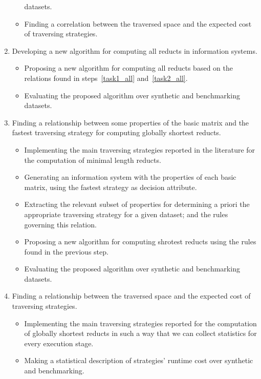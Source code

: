 \documentclass[authoryear,11pt]{elsarticle}
\begin{document}
\begin{enumerate}
\begin{itemize}
  			  datasets.
  		\item Finding a correlation between the traversed space and the expected cost of traversing strategies.
  	\end{itemize}
  	\item Developing a new algorithm for computing all reducts in information systems.
  	\begin{itemize}
  		\item Proposing a new algorithm for computing all reducts based on the relations found in 
  			  steps~\ref{task1_all} and~\ref{task2_all}.
  		\item Evaluating the proposed algorithm over synthetic and benchmarking datasets.
  	\end{itemize}
  	
  	\item Finding a relationship between some properties of the basic matrix and the fastest 
  		  traversing strategy for computing globally shortest reducts.\label{task1_short}
	\begin{itemize}
  		\item Implementing the main traversing strategies reported in the literature for the computation of 
  			  minimal length reducts.
  		\item Generating an information system with the properties of each basic matrix, using 
  			  the fastest strategy as decision attribute.
  		\item Extracting the relevant subset of properties for determining a priori the appropriate 
  			  traversing strategy for a given dataset; and the rules governing this relation.
  		\item Proposing a new algorithm for computing shrotest reducts using the rules found in
  			  the previous step.
  		\item Evaluating the proposed algorithm over synthetic and benchmarking datasets.
  	\end{itemize}
  	\item Finding a relationship between the traversed space and the expected cost of traversing strategies.
  	\label{task2_short}
  	\begin{itemize}
  		\item Implementing the main traversing strategies reported for the computation of globally shortest 
  			  reducts in such a way that we can collect statistics for every execution stage.
  		\item Making a statistical description  of strategies' runtime cost over synthetic and benchmarking.

\end{itemize}
\end{enumerate}
\end{document}
